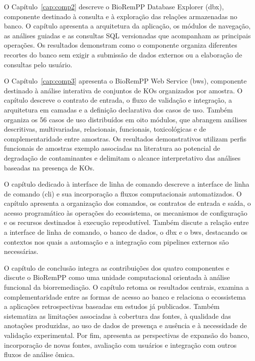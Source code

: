 O Capítulo~\ref{cap:comp2} descreve o BioRemPP Database Explorer
(\gls{dbx}), componente destinado à consulta e à exploração das relações
armazenadas no banco. O capítulo apresenta a arquitetura da aplicação, os
módulos de navegação, as análises guiadas e as
consultas SQL versionadas que acompanham as principais operações. Os resultados
demonstram como o componente organiza diferentes recortes do banco sem exigir
a submissão de dados externos ou a elaboração de consultas pelo usuário.

O Capítulo~\ref{cap:comp3} apresenta o BioRemPP Web Service
(\gls{bws}), componente destinado à análise interativa de conjuntos de KOs
organizados por amostra. O capítulo descreve o contrato de entrada, o fluxo de
validação e integração, a arquitetura em camadas e a definição declarativa dos
casos de uso. Também organiza os 56 casos de uso distribuídos em oito módulos,
que abrangem análises descritivas, multivariadas, relacionais, funcionais,
toxicológicas e de complementaridade entre amostras. Os resultados
demonstrativos utilizam perfis funcionais de amostras exemplo associadas na
literatura ao potencial de degradação de contaminantes e delimitam o alcance
interpretativo das análises baseadas na presença de KOs.

O capítulo dedicado à interface de linha de comando descreve a interface de linha de comando
(\gls{cli}) e sua incorporação a fluxos computacionais automatizados. O
capítulo apresenta a organização dos comandos, os contratos de entrada e
saída, o acesso programático às operações do ecossistema, os mecanismos de
configuração e os recursos destinados à execução reprodutível. Também discute
a relação entre a interface de linha de comando, o banco de dados, o
\gls{dbx} e o \gls{bws}, destacando os contextos nos quais a automação e a
integração com pipelines externos são necessárias.

O capítulo de conclusão integra as contribuições dos quatro componentes
e discute o BioRemPP como uma unidade computacional orientada à análise
funcional da biorremediação. O capítulo retoma os resultados centrais, examina
a complementaridade entre as formas de acesso ao banco e relaciona o
ecossistema a aplicações retrospectivas baseadas em estudos já publicados.
Também sistematiza as limitações associadas à cobertura das fontes, à qualidade
das anotações produzidas, ao uso de dados de presença e ausência e
à necessidade de validação experimental. Por fim, apresenta as perspectivas de
expansão do banco, incorporação de novas fontes, avaliação com usuários e
integração com outros fluxos de análise ômica.
